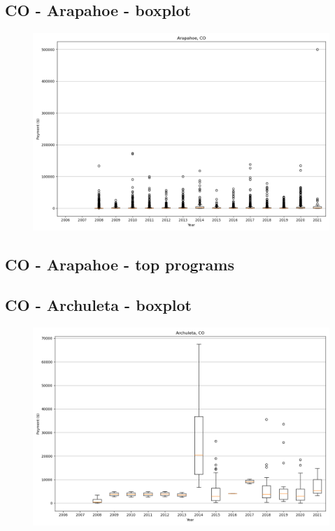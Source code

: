 \subsection*{CO - Arapahoe - boxplot}
\begin{figure}[h]
\centering
\includegraphics[width=7in]{../output/boxplots/counties/Arapahoe-CO_boxplot.png}
\end{figure}


\subsection*{CO - Arapahoe - top programs}

\newpage
\subsection*{CO - Archuleta - boxplot}
\begin{figure}[h]
\centering
\includegraphics[width=7in]{../output/boxplots/counties/Archuleta-CO_boxplot.png}
\end{figure}


